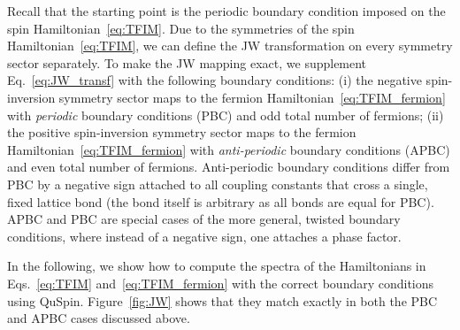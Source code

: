 \documentclass{SciPost}
\newcommand\0{\scalebox{-1}[1]{0}}
\begin{document}
Recall that the starting point is the periodic boundary condition imposed on the spin Hamiltonian~\ref{eq:TFIM}. Due to the symmetries of the spin Hamiltonian~\eqref{eq:TFIM}, we can define the JW transformation on every symmetry sector separately. To make the JW mapping exact, we supplement Eq.~\eqref{eq:JW_transf} with the following boundary conditions: (i) the negative spin-inversion symmetry sector maps to the fermion Hamiltonian~\eqref{eq:TFIM_fermion} with \emph{periodic} boundary conditions (PBC) and odd total number of fermions; (ii) the positive spin-inversion symmetry sector maps to the fermion Hamiltonian~\eqref{eq:TFIM_fermion} with \emph{anti-periodic} boundary conditions (APBC) and even total number of fermions. Anti-periodic boundary conditions differ from PBC by a negative sign attached to all coupling constants that cross a single, fixed lattice bond (the bond itself is arbitrary as all bonds are equal for PBC). APBC and PBC are special cases of the more general, twisted boundary conditions, where instead of a negative sign, one attaches a phase factor.

In the following, we show how to compute the spectra of the Hamiltonians in Eqs.~\eqref{eq:TFIM} and~\eqref{eq:TFIM_fermion} with the correct boundary conditions using QuSpin. Figure~\ref{fig:JW} shows that they match exactly in both the PBC and APBC cases discussed above.
\end{document}
